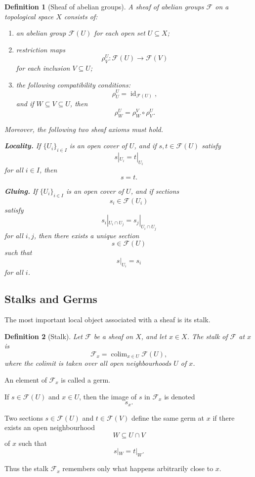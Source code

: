 \documentclass[12pt,a4paper]{article}
\DeclareMathOperator{\id}{id}
\newcommand{\F}{\mathcal F}
\theoremstyle{notespace}
\newtheorem{definition}{Definition}[subsection]
\DeclareMathOperator*{\colim}{colim}
\begin{document}
\begin{definition}[Sheaf of abelian groups]
	A sheaf of abelian groups \(\F\) on a topological space \(X\) consists of:
	\begin{enumerate}[label=\textup{(\roman*)}]
		\item an abelian group \(\F(U)\) for each open set \(U\subseteq X\);
		\item restriction maps
		\[
		\rho^U_V:\F(U)\to \F(V)
		\]
		for each inclusion \(V\subseteq U\);
		\item the following compatibility conditions:
		\[
		\rho^U_U=\id_{\F(U)},
		\]
		and if \(W\subseteq V\subseteq U\), then
		\[
		\rho^U_W=\rho^V_W\circ \rho^U_V.
		\]
	\end{enumerate}
	Moreover, the following two sheaf axioms must hold.
	
	\textbf{Locality.} If \(\{U_i\}_{i\in I}\) is an open cover of \(U\), and if \(s,t\in \F(U)\) satisfy
	\[
	s|_{U_i}=t|_{U_i}
	\]
	for all \(i\in I\), then
	\[
	s=t.
	\]
	
	\textbf{Gluing.} If \(\{U_i\}_{i\in I}\) is an open cover of \(U\), and if sections
	\[
	s_i\in \F(U_i)
	\]
	satisfy
	\[
	s_i|_{U_i\cap U_j}=s_j|_{U_i\cap U_j}
	\]
	for all \(i,j\), then there exists a unique section
	\[
	s\in \F(U)
	\]
	such that
	\[
	s|_{U_i}=s_i
	\]
	for all \(i\).
\end{definition}

\subsection{Stalks and Germs}

The most important local object associated with a sheaf is its stalk.

\begin{definition}[Stalk]
	Let \(\F\) be a sheaf on \(X\), and let \(x\in X\). The stalk of \(\F\) at \(x\) is
	\[
	\F_x=\colim_{x\in U}\F(U),
	\]
	where the colimit is taken over all open neighbourhoods \(U\) of \(x\).
\end{definition}

An element of \(\F_x\) is called a germ.

If \(s\in \F(U)\) and \(x\in U\), then the image of \(s\) in \(\F_x\) is denoted
\[
s_x.
\]

Two sections \(s\in \F(U)\) and \(t\in \F(V)\) define the same germ at \(x\) if there exists an open neighbourhood
\[
W\subseteq U\cap V
\]
of \(x\) such that
\[
s|_W=t|_W.
\]

Thus the stalk \(\F_x\) remembers only what happens arbitrarily close to \(x\).
\end{document}

